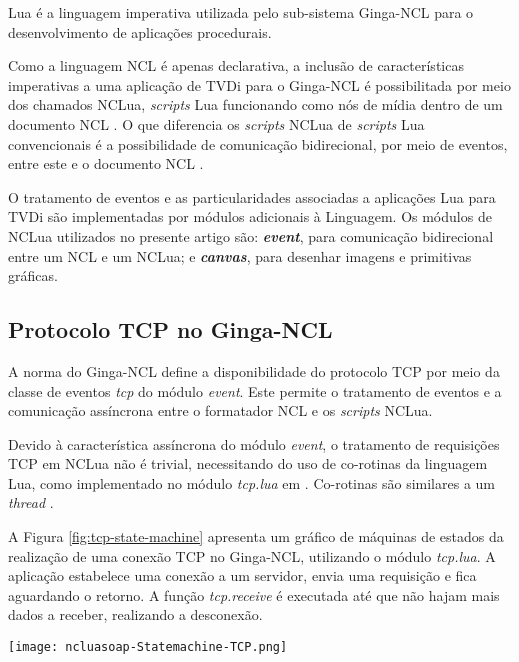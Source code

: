 Lua é a linguagem imperativa utilizada pelo sub-sistema Ginga-NCL para o desenvolvimento
de aplicações procedurais. 

Como a linguagem NCL é apenas declarativa, a inclusão de características imperativas
a uma aplicação de TVDi para o Ginga-NCL é possibilitada por meio dos chamados
NCLua, \textit{scripts} Lua funcionando como nós de mídia dentro de um documento NCL 
\cite{abnt200815606} \cite{soares2007ginga}. 
O que diferencia os \textit{scripts} NCLua de \textit{scripts} Lua convencionais é a possibilidade de comunicação
bidirecional, por meio de eventos, entre este e o documento NCL \cite{abnt200815606}.

O tratamento de eventos e as particularidades associadas a aplicações Lua para TVDi
são implementadas por módulos adicionais à Linguagem\cite{abnt200815606}.
Os módulos de NCLua utilizados no presente artigo são: \textbf{\textit{event}}, 
para comunicação bidirecional entre um NCL e um NCLua;
e \textbf{\textit{canvas}}, para desenhar imagens e primitivas gráficas.

\subsection{Protocolo TCP no Ginga-NCL} \label{sec:tcp}

A norma do Ginga-NCL \cite{abnt200815606} define a disponibilidade do protocolo TCP
por meio da classe de eventos \textit{tcp} do módulo \textit{event}. 
Este permite o tratamento de eventos e a comunicação assíncrona entre o formatador NCL e os \textit{scripts} NCLua. 

Devido à característica assíncrona do módulo \textit{event}, o tratamento de requisições TCP em NCLua não é trivial,
necessitando do uso de co-rotinas da linguagem Lua, como implementado no módulo \textit{tcp.lua} em \cite{doc-nclua}. 
Co-rotinas são similares a um \textit{thread} \cite{ierusalimschy2006programming}.

A Figura \ref{fig:tcp-state-machine} apresenta um gráfico de máquinas de estados
da realização de uma conexão TCP no Ginga-NCL, utilizando o módulo \textit{tcp.lua}.
A aplicação estabelece uma conexão a um servidor, envia uma requisição e fica aguardando o retorno. 
A função \textit{tcp.receive} é executada até que não hajam mais dados a receber, 
realizando a desconexão.

\begin{center}
	\texttt{[image: ncluasoap-Statemachine-TCP.png]}
	\label{fig:tcp-state-machine}
\end{center}

